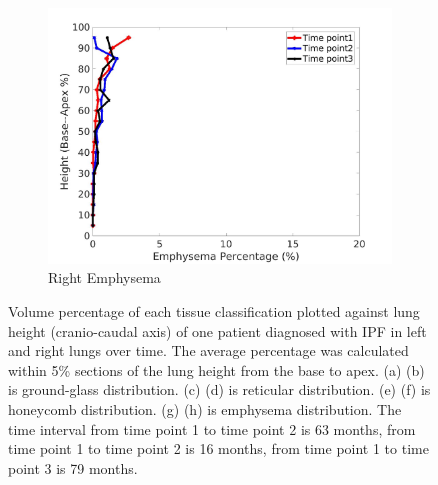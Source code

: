 \begin{figure}[H]
\begin{subfigure}{.42\linewidth}
  \includegraphics[width=\linewidth,trim={{.0\wd0} {.0\wd0} {.0\wd0} {.0\wd0}},clip]{QuantitativeAnalysis/Image/IPF21RightLungEmphysemaDiseaseAgainstHeight.jpg}
  \caption{Right Emphysema}
  \label{fig:IPF21DiseaseAgainstHeightMain-h}
\end{subfigure}
\caption{Volume percentage of each tissue classification plotted against lung height (cranio-caudal axis) of one patient diagnosed with IPF in left and right lungs over time. The average percentage was calculated within 5\% sections of the lung height from the base to apex. (a) (b) is ground-glass distribution. (c) (d) is reticular distribution. (e) (f) is honeycomb distribution. (g) (h) is emphysema distribution. The time interval from time point 1 to time point 2 is 63 months, from time point 1 to time point 2 is 16 months, from time point 1 to time point 3 is 79 months.}
\label{fig:IPF21DiseaseAgainstHeightMain}
\end{figure}

